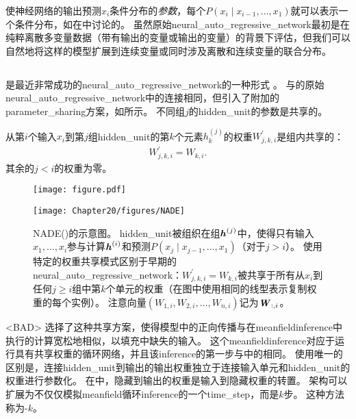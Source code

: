 使神经网络的输出预测$x_i$条件分布的\emph{参数}，每个$P(x_i  \mid  x_{i-1}, \dots, x_1)$就可以表示一个条件分布，如在中讨论的。
虽然原始\gls{neural_auto_regressive_network}最初是在纯粹离散多变量数据（带有输出的变量或输出的变量）的背景下评估，但我们可以自然地将这样的模型扩展到连续变量或同时涉及离散和连续变量的联合分布。


\subsection{}
\label{sec:nade}

是最近非常成功的\gls{neural_auto_regressive_network}的一种形式 \citep{Larochelle+Murray-2011-small}。
与\citet{Bengio+Bengio-NIPS2000}的原始\gls{neural_auto_regressive_network}中的连接相同，但引入了附加的\gls{parameter_sharing}方案，如所示。
不同组$j$的\gls{hidden_unit}的参数是共享的。

从第$i$个输入$x_i$到第$j$组\gls{hidden_unit}的第$k$个元素$h_k^{(j)}$的权重$W_{j,k,i}^{'}$是组内共享的：
\begin{align}
 W_{j,k,i}^{'} = W_{k,i}.
\end{align}
其余的$j<i$的权重为零。


\begin{figure}[!htb]
\ifOpenSource
\centerline{\texttt{[image: figure.pdf]}}
\else
\centerline{\texttt{[image: Chapter20/figures/NADE]}}
\fi
\caption{\gls{NADE}()的示意图。
\gls{hidden_unit}被组织在组$\boldsymbol{\mathit{h}}^{(j)}$中，使得只有输入$x_1,\dots,x_i$参与计算$\boldsymbol{\mathit{h}}^{(i)}$和预测$P(x_j \mid x_{j-1},\dots,x_1)$（对于$j> i$）。
使用特定的权重共享模式区别于早期的\gls{neural_auto_regressive_network}：$W_{j,k,i}^{'} = W_{k,i}$被共享于所有从$x_i$到任何$j \geq i$组中第$k$个单元的权重（在图中使用相同的线型表示复制权重的每个实例）。 
注意向量$(W_{1,i}, W_{2,i},\dots,W_{n,i})$记为$\boldsymbol{\mathit{W}}_{:,i}$。
}
\label{fig:chap20_NADE}
\end{figure}


<BAD>\citet{Larochelle+Murray-2011-small} 选择了这种共享方案，使得模型中的正向传播与在\gls{meanfield}\gls{inference}中执行的计算宽松地相似，以填充中缺失的输入。
这个\gls{meanfield}\gls{inference}对应于运行具有共享权重的循环网络，并且该\gls{inference}的第一步与中的相同。
使用唯一的区别是，连接\gls{hidden_unit}到输出的输出权重独立于连接输入单元和\gls{hidden_unit}的权重进行参数化。
在中，隐藏到输出的权重是输入到隐藏权重的转置。
架构可以扩展为不仅仅模拟\gls{meanfield}循环\gls{inference}的一个\gls{time_step}，而是$k$步。
这种方法称为-$k$\citep{Raiko-et-al-2014}。


